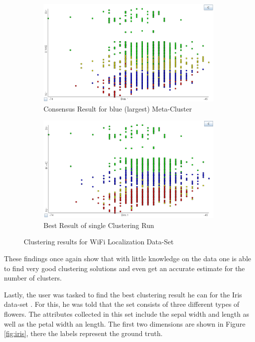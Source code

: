 \documentclass[
	a4paper,
	english,
	twoside,
	openright,               
	11pt                            
	]{report}
\begin{document}
\begin{figure}[h]
\centering
\begin{subfigure}[t]{.49\textwidth}
  \centering
  \includegraphics[width=.95\linewidth]{user_wifi_consensus}
  \caption{Consensus Result for blue (largest) Meta-Cluster}
  \label{fig:user_wifi_consensus}
\end{subfigure}
\hfill
\begin{subfigure}[t]{.49\textwidth}
  \centering
  \includegraphics[width=.95\linewidth]{user_wifi_best}
  \caption{Best Result of single Clustering Run}
  \label{fig:user_wifi_best}
\end{subfigure}

\caption{Clustering results for WiFi Localization Data-Set}
\label{fig:user_wifi}
\end{figure}

These findings once again show that with little knowledge on the data one is able to find very good clustering solutions and even get an accurate estimate for the number of clusters.

Lastly, the user was tasked to find the best clustering result he can for the Iris data-set \cite{Dua:2019}. For this, he was told that the set consists of three different types of flowers. The attributes collected in this set include the sepal width and length as well as the petal width an length. The first two dimensions are shown in Figure \ref{fig:iris}, there the labels represent the ground truth.
\end{document}
